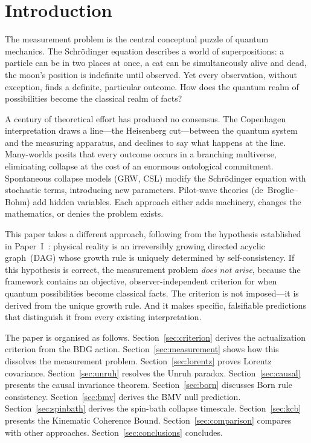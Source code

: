 \documentclass[11pt,a4paper]{article}
\theoremstyle{plain}
\theoremstyle{definition}
\theoremstyle{remark}
\begin{document}
\section{Introduction}\label{sec:intro}

The measurement problem is the central conceptual puzzle of quantum mechanics.  The
Schr\"odinger equation describes a world of superpositions: a particle can be in two
places at once, a cat can be simultaneously alive and dead, the moon's position is
indefinite until observed.  Yet every observation, without exception, finds a
definite, particular outcome.  How does the quantum realm of possibilities become the
classical realm of facts?

A century of theoretical effort has produced no consensus.  The Copenhagen
interpretation draws a line---the Heisenberg cut---between the quantum system and
the measuring apparatus, and declines to say what happens at the line.  Many-worlds
posits that every outcome occurs in a branching multiverse, eliminating collapse at
the cost of an enormous ontological commitment.  Spontaneous collapse models (GRW,
CSL) modify the Schr\"odinger equation with stochastic terms, introducing new
parameters.  Pilot-wave theories (de~Broglie--Bohm) add hidden variables.  Each
approach either adds machinery, changes the mathematics, or denies the problem
exists.

This paper takes a different approach, following from the hypothesis established in
Paper~I~\cite{P1}: physical reality is an irreversibly growing directed acyclic
graph~(DAG) whose growth rule is uniquely determined by self-consistency.  If this
hypothesis is correct, the measurement problem \emph{does not arise}, because the
framework contains an objective, observer-independent criterion for when quantum
possibilities become classical facts.  The criterion is not imposed---it is derived
from the unique growth rule.  And it makes specific, falsifiable predictions that
distinguish it from every existing interpretation.

The paper is organised as follows.  Section~\ref{sec:criterion} derives the
actualization criterion from the BDG action.  Section~\ref{sec:measurement} shows how
this dissolves the measurement problem.  Section~\ref{sec:lorentz} proves Lorentz
covariance.  Section~\ref{sec:unruh} resolves the Unruh paradox.
Section~\ref{sec:causal} presents the causal invariance theorem.
Section~\ref{sec:born} discusses Born rule consistency.  Section~\ref{sec:bmv}
derives the BMV null prediction.  Section~\ref{sec:spinbath} derives the spin-bath
collapse timescale.  Section~\ref{sec:kcb} presents the Kinematic Coherence Bound.
Section~\ref{sec:comparison} compares with other approaches.
Section~\ref{sec:conclusions} concludes.
\end{document}
